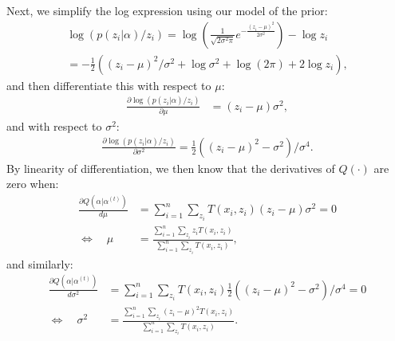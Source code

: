 \documentclass[10pt,letterpaper]{article}
\begin{document}
Next, we simplify the log expression using our model of the prior:  %
\begin{equation}
\begin{aligned}
\log \left( p(z_i | \alpha) / z_i \right) = \log \left( \frac{1}{\sqrt{2\sigma^2 \pi}} e^{-\frac{(z_i - \mu)^2}{2\sigma^2}} \right) - \log z_i \\
= -\frac{1}{2} \left( (z_i - \mu)^2 / \sigma^2 + \log \sigma^2 + \log \left( 2\pi \right) + 2 \log z_i \right) ,
\end{aligned}
\end{equation}
and then differentiate this with respect to $\mu$:
\begin{equation}
\begin{aligned}
\frac{\partial \log \left( p(z_i | \alpha) / z_i \right)}{\partial \mu} &= (z_i - \mu)\sigma^2 ,
\end{aligned}
\end{equation}
and with respect to $\sigma^2$:
\begin{equation}
\begin{aligned}
\frac{\partial \log \left( p(z_i | \alpha) / z_i \right)}{\partial \sigma^2} %
= \frac{1}{2}\left((z_i - \mu)^2 - \sigma^2 \right)/\sigma^4 .
\end{aligned}
\end{equation}
By linearity of differentiation, we then know that the derivatives of $Q(\cdot)$ are zero when:
\begin{equation}
\begin{aligned}
\frac{\partial Q(\alpha | \alpha^{(t)})}{d \mu} &= \sum_{i=1}^n \sum_{z_i} T(x_i, z_i) (z_i - \mu)\sigma^2 = 0  \\
\iff \quad \mu &= \frac{\sum_{i=1}^n \sum_{z_i} z_i T(x_i, z_i)}{\sum_{i=1}^n \sum_{z_i} T(x_i, z_i)} ,
\end{aligned}
\end{equation}
and similarly:
\begin{equation}
\begin{aligned}
\frac{\partial Q(\alpha | \alpha^{(t)})}{d \sigma^2} &= \sum_{i=1}^n \sum_{z_i} T(x_i, z_i) \frac{1}{2}\left((z_i - \mu)^2 - \sigma^2 \right)/\sigma^4 = 0  \\
\iff \quad \sigma^2 &= \frac{\sum_{i=1}^n \sum_{z_i} (z_i - \mu)^2 T(x_i, z_i)}{\sum_{i=1}^n \sum_{z_i} T(x_i, z_i)} .
\end{aligned}
\end{equation}
\end{document}
